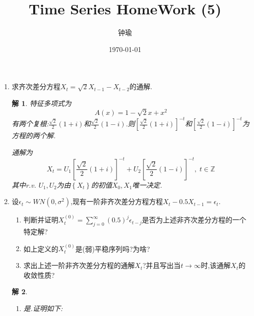 \documentclass[11pt,a4paper]{ctexart}
\title{Time Series HomeWork (5)}
\author{钟瑜 \quad 222018314210044}
\date{\today}
\newtheorem*{solution}{解}
\begin{document}
\maketitle
\pagestyle{plain}%
\begin{enumerate}
	
\item[1.]求齐次差分方程$ X_t=\sqrt{2}X_{t-1}-X_{t-2} $的通解.
\begin{solution}
特征多项式为
\begin{equation}
A(x)=1-\sqrt{2}x+x^2
\end{equation}
有两个复根:$ \frac{\sqrt{2}}{2}(1+i) $和$ \frac{\sqrt{2}}{2}(1-i) $.则$ [\frac{\sqrt{2}}{2}(1+i)]^{-t} $和$[\frac{\sqrt{2}}{2}(1-i)]^{-t} $为方程的两个解.

通解为
\begin{equation}
X_t=U_1[\frac{\sqrt{2}}{2}(1+i)]^{-t}+U_2[\frac{\sqrt{2}}{2}(1-i)]^{-t},\;t\in\mathbb{Z}
\end{equation}
其中r.v. $ U_1,U_2 $为由$ \left\lbrace X_t\right\rbrace  $的初值$X_0,X_1 $唯一决定.
\end{solution}

\item[2.]设$ \epsilon_t \sim WN(0,\sigma^2)$,现有一阶非齐次差分方程方程$ X_t-0.5X_{t-1}=\epsilon_t $.
\begin{enumerate}
	\item[1)]判断并证明$ X_t^{(0)}=\sum_{j=0}^{\infty }(0.5)^j \epsilon_{t-j} $是否为上述非齐次差分方程的一个特定解?
	\item[2)]如上定义的$  X_t^{(0)} $是(弱)平稳序列吗?为啥?
	\item[3)]求出上述一阶非齐次差分方程的通解$ X_t $?并且写出当$ t\rightarrow\infty $时,该通解$ X_t $的收敛性质?
\end{enumerate}
\begin{solution}
\begin{enumerate}
	\item[1)]是.证明如下:
	

\end{enumerate}
\end{solution}
\end{enumerate}
\end{document}
